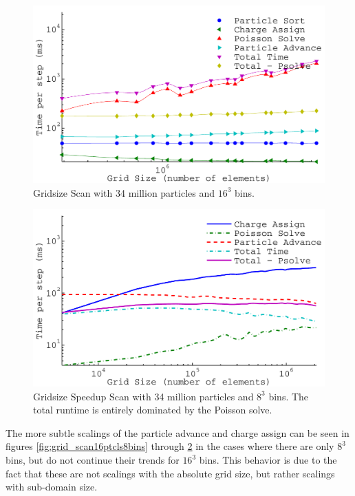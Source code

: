 \begin{figure}
\begin{center}
\includegraphics[width=6in]{performance/gridsize_scan34ptcls16bins.pdf}
\end{center}
\caption[Gridsize Scan with 34 million particles and $16^3$ bins.]{Gridsize Scan with 34 million particles and $16^3$ bins.}
\label{fig:grid_scan34ptcls16bins}
\end{figure}

\begin{figure}
\begin{center}
\includegraphics[width=6in]{performance/gridsize_speedup_scan.pdf}
\end{center}
\caption[Gridsize Speedup Scan with 34 million particles and $8^3$ bins]{Gridsize Speedup Scan with 34 million particles and $8^3$ bins. The total runtime is entirely dominated by the Poisson solve.}
\label{fig:grid_scan34ptcls16bins}
\end{figure}

The more subtle scalings of the particle advance and charge assign can be seen in figures \ref{fig:grid_scan16ptcls8bins} through \ref{fig:grid_scan34ptcls16bins} in the cases where there are only $8^3$ bins, but do not continue their trends for $16^3$ bins. This behavior is due to the fact that these are not scalings with the absolute grid size, but rather scalings with sub-domain size.

